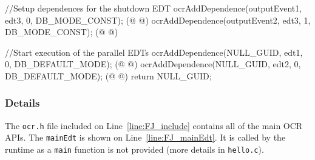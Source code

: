 \begin{ocrsnip}
{    //Setup dependences for the shutdown EDT
    ocrAddDependence(outputEvent1, edt3, 0, DB_MODE_CONST); (@ \label{line:FJ_edt3Dep1} @)
    ocrAddDependence(outputEvent2, edt3, 1, DB_MODE_CONST); (@ \label{line:FJ_edt3Dep2} @)

    //Start execution of the parallel EDTs
    ocrAddDependence(NULL_GUID, edt1, 0, DB_DEFAULT_MODE); (@ \label{line:FJ_edt1start} @)
    ocrAddDependence(NULL_GUID, edt2, 0, DB_DEFAULT_MODE); (@ \label{line:FJ_edt2start} @)
    return NULL_GUID;
}
\end{ocrsnip}
\subsubsection{Details}

The \texttt{ocr.h} file included on Line~\ref{line:FJ_include}
contains all of the main OCR APIs. The \texttt{mainEdt} is
shown on Line~\ref{line:FJ_mainEdt}. It is called by the runtime
as a \texttt{main} function is not provided
(more details in \texttt{hello.c}).

